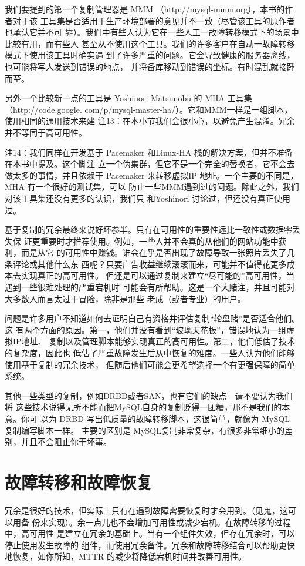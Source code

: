 我们要提到的第一个复制管理器是 MMM （http://mysql-mmm.org），本书的作者对于该
工具集是否适用于生产环境部署的意见并不一致（尽管该工具的原作者也承认它并不可
靠）。我们中有些人认为它在一些人工一故障转移模式下的场景中比较有用，而有些人
甚至从不使用这个工具。我们的许多客户在自动一故障转移模式下使用该工具时确实遇
到了许多严重的问题。它会导致健康的服务器离线，也可能将写人发送到错误的地点，
并将备库移动到错误的坐标。有时混乱就接踵而至。

另外一个比较新一点的工具是 Yoshinori Matsunobu 的 MHA 工具集 （http://code.google.
com/p/mysql-master-ha/）。它和MMM一样是一组脚本，使用相同的通用技术来建
注13：在本小节我们会很小心，以避免产生混淆。冗余并不等同于高可用性。

注14：我们同样在开发基于 Pacemaker 和Linux-HA 栈的解决方案，但并不准备在本书中提及。这个脚注
立一个伪集群，但它不是一个完全的替换者，它不会去做太多的事情，并且依赖干
Pacemaker 来转移虚拟IP 地址。一个主要的不同是，MHA 有一个很好的测试集，可以
防止一些MMM遇到过的问题。除此之外，我们对该工具集还没有更多的认识，我们只
和Yoshinori 讨论过，但还没有真正使用过。

基于复制的冗余最终来说好坏参半。只有在可用性的重要性远比一致性或数据零丢失保
证更重要时才推荐使用。例如，一些人并不会真的从他们的网站功能中获利，而是从它
的可用性中赚钱。谁会在乎是否出现了故障导致一张照片丢失了几条评论或其他什么东
西呢？只要广告收益继续滚滚而来，可能并不值得花更多成本去实现真正的高可用性。
但还是可以通过复制来建立“尽可能的”高可用性，当遇到一些很难处理的严重宕机时
可能会有所帮助。这是一个大赌注，并且可能对大多数人而言太过于冒险，除非是那些
老成（或者专业）的用户。

问题是许多用户不知道如何去证明自己有资格并评估复制“轮盘赌”是否适合他们。这
有两个方面的原因。第一，他们并没有看到“玻璃天花板”，错误地认为一组虚拟IP地址、
复制以及管理脚本能够实现真正的高可用性。第二，他们低估了技术的复杂度，因此也
低估了严重故障发生后从中恢复的难度。一些人认为他们能够使用基于复制的冗余技术，
但随后他们可能会更希望选择一个有更强保障的简单系统。

其他一些类型的复制，例如DRBD或者SAN，也有它们的缺点—请不要认为我们将
这些技术说得无所不能而把MySQL自身的复制贬得一团糟，那不是我们的本意。你可
以为 DRBD 写出低质量的故障转移脚本，这很简单，就像为 MySQL 复制编写脚本一样。
主要的区别是 MySQL复制非常复杂，有很多非常细小的差别，并且不会阻止你干坏事。
\section{故障转移和故障恢复}
冗余是很好的技术，但实际上只有在遇到故障需要恢复时才会用到。（见鬼，这可以用备
份来实现）。余一点儿也不会增加可用性或减少宕机。在故障转移的过程中，高可用性
是建立在冗余的基础上。当有一个组件失效，但存在冗余时，可以停止使用发生故障的
组件，而使用冗余备件。冗余和故障转移结合可以帮助更快地恢复，如你所知，MTTR
的减少将降低宕机时间并改善可用性。

